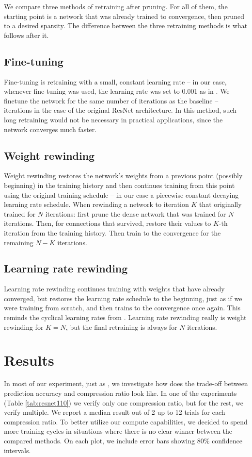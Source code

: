 We compare three methods of retraining after pruning. For all of them, the starting point is a network that was already trained to convergence, then pruned to a desired sparsity. The difference between the three retraining methods is what follows after it.

\subsection{Fine-tuning}
Fine-tuning is retraining with a small, constant learning rate -- in our case, whenever fine-tuning was used, the learning rate was set to 0.001 as in \cite{Renda}. We finetune the network for the same number of iterations as the baseline --  iterations in the case of the original ResNet architecture. In this method, such long retraining would not be necessary in practical applications, since the network converges much faster.

\subsection{Weight rewinding}
Weight rewinding restores the network's weights from a previous point (possibly beginning) in the training history and then continues training from this point using the original training schedule -- in our case a piecewise constant decaying learning rate schedule.
When rewinding a network to iteration $K$ that originally trained for $N$ iterations: first prune the dense network that was trained for $N$ iterations. Then, for connections that survived, restore their values to $K$-th iteration from the training history. Then train to the convergence for the remaining $N-K$ iterations.

\subsection{Learning rate rewinding}
Learning rate rewinding continues training with weights that have already converged, but restores the learning rate schedule to the beginning, just as if we were training from scratch, and then trains to the convergence once again. This reminds the cyclical learning rates from \cite{cyclical}. Learning rate rewinding really is weight rewinding for $K = N$, but the final retraining is always for $N$ iterations.

\section{Results}
In most of our experiment, just as \cite{Renda}, we investigate how does the trade-off between prediction accuracy and compression ratio look like. 
In one of the experiments (Table \ref{tab:resnet110}) we verify only one compression ratio, but for the rest, we verify multiple.
We report a median result out of 2 up to 12 trials for each compression ratio. To better utilize our compute capabilities, we decided to spend more training cycles in situations where there is no clear winner between the compared methods. On each plot, we include error bars showing 80\% confidence intervals.

